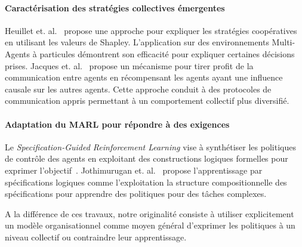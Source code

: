 \documentclass[demonstration]{jfsma}
\begin{document}
\paragraph{\textbf{Caractérisation des stratégies collectives émergentes}}
%
Heuillet et. al.~\cite{Heuillet2022} propose une approche pour expliquer les stratégies coopératives en utilisant les valeurs de Shapley. L'application sur des environnements Multi-Agents à particules démontrent son efficacité pour expliquer certaines décisions prises.
%
Jacques et. al.~\cite{Jaques2019} propose un mécanisme pour tirer profit de la communication entre agents en récompensant les agents ayant une influence causale sur les autres agents. Cette approche conduit à des protocoles de communication appris permettant à un comportement collectif plus diversifié.

\paragraph{\textbf{Adaptation du MARL pour répondre à des exigences}}
%
%
Le \emph{Specification-Guided Reinforcement Learning} vise à synthétiser les politiques de contrôle des agents en exploitant des constructions logiques formelles pour exprimer l'objectif~\cite{Bansal2022}.%
%
Jothimurugan et. al.~\cite{Jothimurugan2021} propose l'apprentissage par spécifications logiques comme l'exploitation la structure compositionnelle des spécifications pour apprendre des politiques pour des tâches complexes.

A la différence de ces travaux, notre originalité consiste à utiliser explicitement un modèle organisationnel comme moyen général d'exprimer les politiques à un niveau collectif ou contraindre leur apprentissage. %


\end{document}
